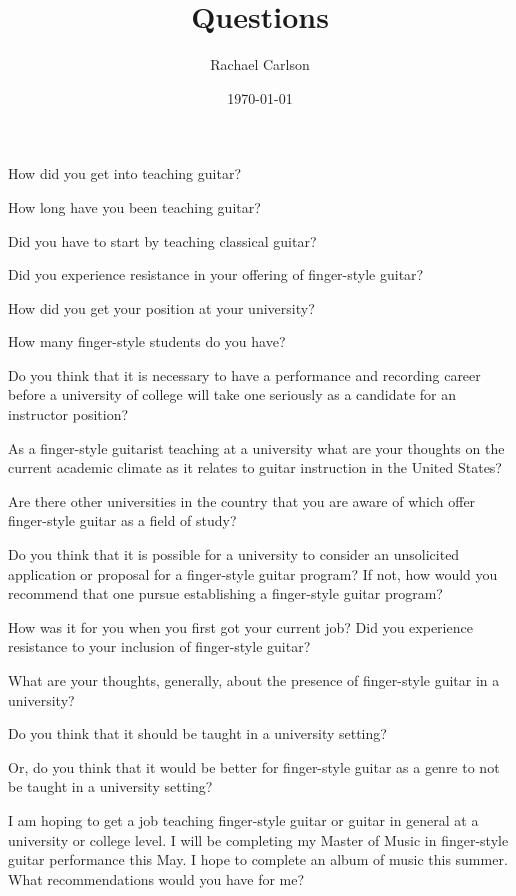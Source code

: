 \documentclass{tufte-handout}
\title{Questions}
\author{Rachael Carlson}
\date{\today}
\begin{document}
\maketitle

How did you get into teaching guitar?

How long have you been teaching guitar?

Did you have to start by teaching classical guitar?

Did you experience resistance in your offering of finger-style guitar?
\vspace{.15in}

\noindent How did you get your position at your university?

\vspace{.15in}

\noindent How many finger-style students do you have?
\vspace{.15in}

\noindent Do you think that it is necessary to have a performance and
recording career before a university of college will take one seriously as a
candidate for an instructor position?
\vspace{.15in}

\noindent As a finger-style guitarist teaching at a university what are your
thoughts on the current academic climate as it relates to guitar instruction
in the United States?
\vspace{.15in}

\noindent Are there other universities in the country that you are aware of
which offer finger-style guitar as a field of study?
\vspace{.15in}

\noindent Do you think that it is possible for a university to consider an
unsolicited application or proposal for a finger-style guitar program? If not,
how would you recommend that one pursue establishing a finger-style guitar program?
\vspace{.15in}

\noindent How was it for you when you first got your current job? Did you
experience resistance to your inclusion of finger-style guitar?
\vspace{.15in}

\noindent What are your thoughts, generally, about the presence of
finger-style guitar in a university? 

Do you think that it should be taught in a university setting?

Or, do you think that it would be better for finger-style guitar as a genre to
not be taught in a university setting?

\vspace{.15in}
\noindent I am hoping to get a job teaching finger-style guitar or guitar in
general at a university or college level. I will be completing my Master of
Music in finger-style guitar performance this May. I hope to complete an album
of music this summer. What recommendations would you have for me?
\end{document}
